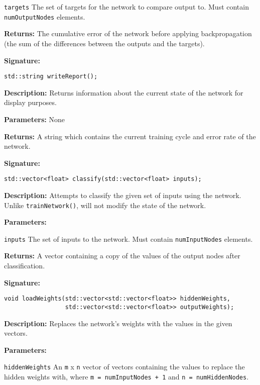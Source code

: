 \documentclass[a4paper]{article}
\begin{document}
\lstinline{targets} The set of targets for the network to compare output to. Must contain \lstinline{numOutputNodes} elements.

\textbf{Returns: }
The cumulative error of the network before applying backpropagation (the sum of the differences between the outputs and the targets).

\hrulefill %

\textbf{Signature:} \begin{lstlisting}
std::string writeReport();
\end{lstlisting}

\textbf{Description: }
Returns information about the current state of the network for display purposes.

\textbf{Parameters: } None

\textbf{Returns: }
A string which contains the current training cycle and error rate of the network.

\hrulefill %
\newpage
\hrulefill

\textbf{Signature:} \begin{lstlisting}
std::vector<float> classify(std::vector<float> inputs);
\end{lstlisting}

\textbf{Description: }
Attempts to classify the given set of inputs using the network. Unlike \lstinline{trainNetwork()}, will not modify the state of the network.

\textbf{Parameters: }

\lstinline{inputs} The set of inputs to the network. Must contain \lstinline{numInputNodes} elements.

\textbf{Returns: }
A vector containing a copy of the values of the output nodes after classification.
\hrulefill %

\textbf{Signature:} \begin{lstlisting}
void loadWeights(std::vector<std::vector<float>> hiddenWeights,
                 std::vector<std::vector<float>> outputWeights);
\end{lstlisting}

\textbf{Description: }
Replaces the network's weights with the values in the given vectors.

\textbf{Parameters: }

\lstinline{hiddenWeights} An \lstinline{m} x \lstinline{n} vector of vectors containing the values to replace the hidden weights with, where \lstinline{m = numInputNodes + 1} and \lstinline{n = numHiddenNodes}.
\end{document}
